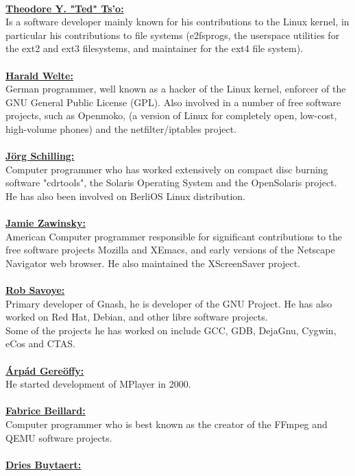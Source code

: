 \documentclass[10pt, a4paper, oneside]{report}
\begin{document}
\\
\textbf{\underline{Theodore Y. "Ted" Ts'o:}}\\
Is a software developer mainly known for his contributions to the Linux kernel, in particular his contributions to file systems (e2fsprogs, the userspace utilities for the ext2 and ext3 filesystems, and maintainer for the ext4 file system).\\
\\
\textbf{\underline{Harald Welte:}}\\
German programmer, well known as a hacker of the Linux kernel, enforcer of the GNU General Public License (GPL).  Also involved in a number of free software projects, such as Openmoko, (a version of Linux for completely open, low-cost, high-volume phones) and the netfilter/iptables project.\\
\\
\textbf{\underline{Jörg Schilling:}}\\
Computer programmer who has worked extensively on compact disc burning software "cdrtools", the Solaris Operating System and the OpenSolaris project. He has also been involved on BerliOS Linux distribution.\\
\\
\textbf{\underline{Jamie Zawinsky:}}\\
American Computer programmer responsible for significant contributions to the free software projects Mozilla and XEmacs, and early versions of the Netscape Navigator web browser. He also maintained the XScreenSaver project.\\
\\
\textbf{\underline{Rob Savoye:}}\\
Primary developer of Gnash, he is developer of the GNU Project. He has also worked on Red Hat, Debian, and other libre software projects.\\
Some of the projects he has worked on include GCC, GDB, DejaGnu, Cygwin, eCos and CTAS.\\
\\
\textbf{\underline{Árpád Gereöffy:}}\\ 
He started development of MPlayer in 2000.\\
\\
\textbf{\underline{Fabrice Beillard:}}\\
Computer programmer who is best known as the creator of the FFmpeg and QEMU software projects.\\
\\
\textbf{\underline{Dries Buytaert:}}\\
\end{document}
